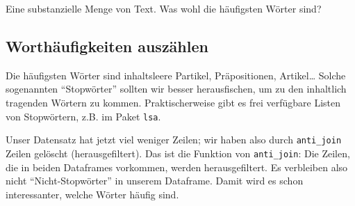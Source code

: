 \documentclass[12pt,ngerman,]{book}
\makeatletter
\newenvironment{Shaded}{\begin{snugshade}}{\end{snugshade}}
\newcommand{\KeywordTok}[1]{\textcolor[rgb]{0.13,0.29,0.53}{\textbf{{#1}}}}
\newcommand{\DataTypeTok}[1]{\textcolor[rgb]{0.13,0.29,0.53}{{#1}}}
\newcommand{\StringTok}[1]{\textcolor[rgb]{0.31,0.60,0.02}{{#1}}}
\newcommand{\CommentTok}[1]{\textcolor[rgb]{0.56,0.35,0.01}{\textit{{#1}}}}
\newcommand{\OtherTok}[1]{\textcolor[rgb]{0.56,0.35,0.01}{{#1}}}
\newcommand{\NormalTok}[1]{{#1}}
\newenvironment{kframe}{%
\medskip{}
\setlength{\fboxsep}{.8em}
 \def\at@end@of@kframe{}%
 \ifinner\ifhmode%
  \def\at@end@of@kframe{\end{minipage}}%
  \begin{minipage}{\columnwidth}%
 \fi\fi%
 \def\FrameCommand##1{\hskip\@totalleftmargin \hskip-\fboxsep
 \colorbox{shadecolor}{##1}\hskip-\fboxsep
     \hskip-\linewidth \hskip-\@totalleftmargin \hskip\columnwidth}%
 \MakeFramed {\advance\hsize-\width
   \@totalleftmargin\z@ \linewidth\hsize
   \@setminipage}}%
 {\par\unskip\endMakeFramed%
 \at@end@of@kframe}
\renewenvironment{Shaded}{\begin{kframe}}{\end{kframe}}
\makeatother
\begin{document}
Eine substanzielle Menge von Text. Was wohl die häufigsten Wörter sind?

\subsection{Worthäufigkeiten
auszählen}\label{worthaufigkeiten-auszahlen}

\begin{Shaded}
\end{Shaded}

Die häufigsten Wörter sind inhaltsleere Partikel, Präpositionen,
Artikel\ldots{} Solche sogenannten ``Stopwörter'' sollten wir besser
herausfischen, um zu den inhaltlich tragenden Wörtern zu kommen.
Praktischerweise gibt es frei verfügbare Listen von Stopwörtern, z.B. im
Paket \texttt{lsa}.

\begin{Shaded}
\end{Shaded}

Unser Datensatz hat jetzt viel weniger Zeilen; wir haben also durch
\texttt{anti\_join} Zeilen gelöscht (herausgefiltert). Das ist die
Funktion von \texttt{anti\_join}: Die Zeilen, die in beiden Dataframes
vorkommen, werden herausgefiltert. Es verbleiben also nicht
``Nicht-Stopwörter'' in unserem Dataframe. Damit wird es schon
interessanter, welche Wörter häufig sind.
\end{document}
